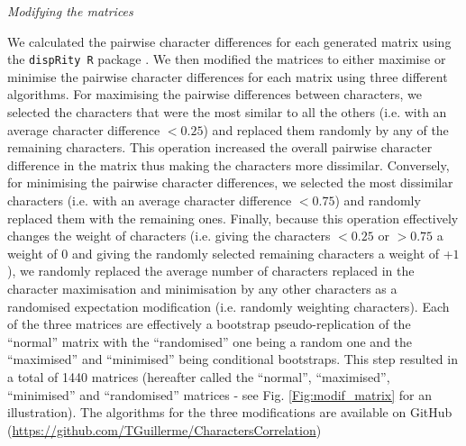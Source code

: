 \documentclass[12pt,letterpaper]{article}
\renewcommand{\subsection}[1]{%
\bigskip
\begin{center}
\begin{large}
\normalfont\itshape #1
\end{large}
\end{center}}
\begin{document}
\subsection{Modifying the matrices}
We calculated the pairwise character differences for each generated matrix using the \texttt{dispRity R} package \citep{thomas_guillerme_2016_55646}.
We then modified the matrices to either maximise or minimise the pairwise character differences for each matrix using three different algorithms.
For maximising the pairwise differences between characters, we selected the characters that were the most similar to all the others (i.e. with an average character difference $<0.25$) and replaced them randomly by any of the remaining characters.
This operation increased the overall pairwise character difference in the matrix thus making the characters more dissimilar.
Conversely, for minimising the pairwise character differences, we selected the most dissimilar characters (i.e. with an average character difference $<0.75$) and randomly replaced them with the remaining ones.
Finally, because this operation effectively changes the weight of characters (i.e. giving the characters $<0.25$ or $>0.75$ a weight of $0$ and giving the randomly selected remaining characters a weight of +$1$), we randomly replaced the average number of characters replaced in the character maximisation and minimisation by any other characters as a randomised expectation modification (i.e. randomly weighting characters).
Each of the three matrices are effectively a bootstrap pseudo-replication of the ``normal'' matrix with the ``randomised'' one being a random one and the ``maximised'' and ``minimised'' being conditional bootstraps.
This step resulted in a total of 1440 matrices (hereafter called the ``normal'', ``maximised'', ``minimised'' and ``randomised'' matrices - see Fig. \ref{Fig:modif_matrix} for an illustration).
The algorithms for the three modifications are available on GitHub (\url{https://github.com/TGuillerme/CharactersCorrelation})
\end{document}
